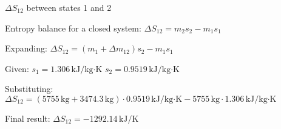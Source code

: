 \( \Delta S_{12} \) between states 1 and 2  

Entropy balance for a closed system:  
\( \Delta S_{12} = m_2 s_2 - m_1 s_1 \)  

Expanding:  
\( \Delta S_{12} = (m_1 + \Delta m_{12}) s_2 - m_1 s_1 \)  

Given:  
\( s_1 = 1.306 \, \text{kJ/kg·K} \)  
\( s_2 = 0.9519 \, \text{kJ/kg·K} \)  

Substituting:  
\( \Delta S_{12} = (5755 \, \text{kg} + 3474.3 \, \text{kg}) \cdot 0.9519 \, \text{kJ/kg·K} - 5755 \, \text{kg} \cdot 1.306 \, \text{kJ/kg·K} \)  

Final result:  
\( \Delta S_{12} = -1292.14 \, \text{kJ/K} \)